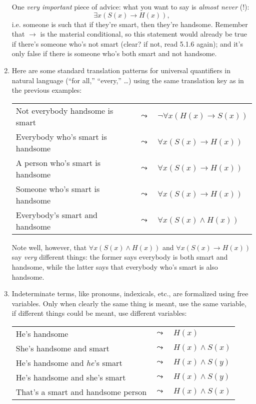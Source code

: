 \begin{enumerate}[\thesection.1]
\begin{longtable}{p{6cm} c l}
		\end{longtable}
		
		One \emph{very important} piece of advice: what you want to say is \emph{almost never} (!): \[\exists x(S(x)\to H(x)),\] i.e. someone is such that if they're smart, then they're handsome. Remember that $\to$ is the material conditional, so this statement would already be true if there's someone who's not smart (clear? if not, read 5.1.6 again); and it's only false if there is someone who's both smart and not handsome.
		
		
		\item Here are some standard translation patterns for universal quantifiers in natural language (``for all,'' ``every,'' \dots) using the same translation key as in the previous examples:		
		\begin{longtable}{p{6cm} c l}
		
		Not everybody handsome is smart & $\leadsto$ & $\neg\forall x(H(x)\to S(x))$\\
Everybody who's smart is handsome & $\leadsto$ &$\forall x(S(x)\to H(x))$\\
A person who's smart is handsome & $\leadsto$ &$\forall x(S(x)\to H(x))$\\
Someone who's smart is handsome & $\leadsto$ &$\forall x(S(x)\to H(x))$\\
Everybody's smart and handsome & $\leadsto$ &$\forall x(S(x)\land H(x))$
		\end{longtable}
		Note well, however, that $\forall x(S(x)\land H(x))$ and $\forall x(S(x)\to H(x))$ say \emph{very} different things: the former says everybody is both smart and handsome, while the latter says that everybody who's smart is also handsome.
		
		\item Indeterminate terms, like pronouns, indexicals, etc., are formalized using free variables. Only when clearly the same thing is meant, use the same variable, if different things could be meant, use different variables:
		
		\begin{longtable}{p{7cm} c l}
		He's handsome & $\leadsto$ & $H(x)$\\
		She's handsome and smart & $\leadsto$ & $H(x)\land S(x)$\\
		He's handsome and \emph{he}'s smart & $\leadsto$ & $H(x)\land S(y)$\\
		He's handsome and she's smart & $\leadsto$ & $H(x)\land S(y)$\\
		That's a smart and handsome person & $\leadsto$ & $H(x)\land S(x)$\\
		

\end{longtable}
\end{enumerate}
